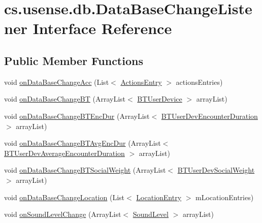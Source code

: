\hypertarget{interfacecs_1_1usense_1_1db_1_1_data_base_change_listener}{}\section{cs.\+usense.\+db.\+Data\+Base\+Change\+Listener Interface Reference}
\label{interfacecs_1_1usense_1_1db_1_1_data_base_change_listener}
\subsection*{Public Member Functions}
\begin{DoxyCompactItemize}
\item 
void \hyperlink{interfacecs_1_1usense_1_1db_1_1_data_base_change_listener_a7fd4ebe843b2f96038f9d89ddc00d0a6}{on\+Data\+Base\+Change\+Acc} (List$<$ \hyperlink{classcs_1_1usense_1_1accelerometer_1_1_actions_entry}{Actions\+Entry} $>$ actions\+Entries)
\item 
void \hyperlink{interfacecs_1_1usense_1_1db_1_1_data_base_change_listener_a8b5ee0b9aee0f27573a57ecaaac6fb27}{on\+Data\+Base\+Change\+B\+T} (Array\+List$<$ \hyperlink{classcs_1_1usense_1_1bluetooth_1_1_b_t_user_device}{B\+T\+User\+Device} $>$ array\+List)
\item 
void \hyperlink{interfacecs_1_1usense_1_1db_1_1_data_base_change_listener_a46c75b1665d88b2595ae16fc2ada60f0}{on\+Data\+Base\+Change\+B\+T\+Enc\+Dur} (Array\+List$<$ \hyperlink{classcs_1_1usense_1_1bluetooth_1_1_b_t_user_dev_encounter_duration}{B\+T\+User\+Dev\+Encounter\+Duration} $>$ array\+List)
\item 
void \hyperlink{interfacecs_1_1usense_1_1db_1_1_data_base_change_listener_a6c3817756f364ca729cb2854b347b65b}{on\+Data\+Base\+Change\+B\+T\+Avg\+Enc\+Dur} (Array\+List$<$ \hyperlink{classcs_1_1usense_1_1bluetooth_1_1_b_t_user_dev_average_encounter_duration}{B\+T\+User\+Dev\+Average\+Encounter\+Duration} $>$ array\+List)
\item 
void \hyperlink{interfacecs_1_1usense_1_1db_1_1_data_base_change_listener_a6d645b06a18d5378dc9b5dec6f62a4c7}{on\+Data\+Base\+Change\+B\+T\+Social\+Weight} (Array\+List$<$ \hyperlink{classcs_1_1usense_1_1bluetooth_1_1_b_t_user_dev_social_weight}{B\+T\+User\+Dev\+Social\+Weight} $>$ array\+List)
\item 
void \hyperlink{interfacecs_1_1usense_1_1db_1_1_data_base_change_listener_a6312469b81fa1a36a02985c0d21edce7}{on\+Data\+Base\+Change\+Location} (List$<$ \hyperlink{classcs_1_1usense_1_1location_1_1_location_entry}{Location\+Entry} $>$ m\+Location\+Entries)
\item 
void \hyperlink{interfacecs_1_1usense_1_1db_1_1_data_base_change_listener_a0b6a90770afd336f60aa7c643c3dde01}{on\+Sound\+Level\+Change} (Array\+List$<$ \hyperlink{classcs_1_1usense_1_1microphone_1_1_sound_level}{Sound\+Level} $>$ array\+List)
\end{DoxyCompactItemize}


